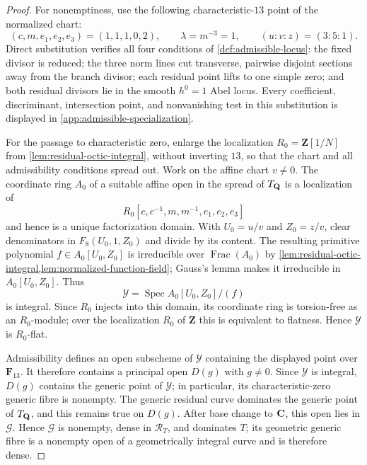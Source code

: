 \begin{proof}
For nonemptiness, use the following characteristic-$13$ point of the
normalized chart:
\[
 (c,m,e_1,e_2,e_3)=(1,1,1,0,2),\qquad \lambda=m^{-3}=1,
 \qquad
 (u:v:z)=(3:5:1).
\]
Direct substitution verifies all four conditions of
\cref{def:admissible-locus}: the fixed divisor is reduced; the three norm
lines cut transverse, pairwise disjoint sections away from the branch
divisor; each residual point lifts to one simple zero; and both residual
divisors lie in the smooth $h^0=1$ Abel locus.  Every coefficient,
discriminant, intersection point, and nonvanishing test in this substitution
is displayed in \cref{app:admissible-specialization}.

For the passage to characteristic zero, enlarge the localization
$R_0=\mathbf Z[1/N]$ from \cref{lem:residual-octic-integral}, without
inverting $13$, so that the chart and all admissibility conditions spread
out.  Work on the affine chart $v\ne0$.  The coordinate ring $A_0$ of a
suitable affine open in the spread of $T_{\mathbf Q}$ is a localization of
\[
 R_0[c,c^{-1},m,m^{-1},e_1,e_2,e_3]
\]
and hence is a unique factorization domain.  With
$U_0=u/v$ and $Z_0=z/v$, clear denominators in $F_8(U_0,1,Z_0)$ and divide
by its content.  The resulting primitive polynomial
$f\in A_0[U_0,Z_0]$ is irreducible over $\operatorname{Frac}(A_0)$ by
\cref{lem:residual-octic-integral,lem:normalized-function-field}; Gauss's
lemma makes it irreducible in $A_0[U_0,Z_0]$.  Thus
\[
 \mathscr Y=\operatorname{Spec}A_0[U_0,Z_0]/(f)
\]
is integral.  Since $R_0$ injects into this domain, its coordinate ring is
torsion-free as an $R_0$-module; over the localization $R_0$ of $\mathbf Z$
this is equivalent to flatness.  Hence $\mathscr Y$ is $R_0$-flat.

Admissibility defines an open subscheme of $\mathscr Y$ containing the
displayed point over $\mathbf F_{13}$.  It therefore contains a principal
open $D(g)$ with $g\ne0$.  Since $\mathscr Y$ is integral, $D(g)$ contains
the generic point of $\mathscr Y$; in particular, its characteristic-zero
generic fibre is nonempty.  The generic residual curve dominates the generic
point of $T_{\mathbf Q}$, and this remains true on $D(g)$.  After base change to
$\mathbf C$, this open lies in $\mathscr G$.  Hence $\mathscr G$ is nonempty, dense in $\mathscr R_T$, and
dominates $T$; its geometric generic fibre is a nonempty open of a
geometrically integral curve and is therefore dense.
\end{proof}


